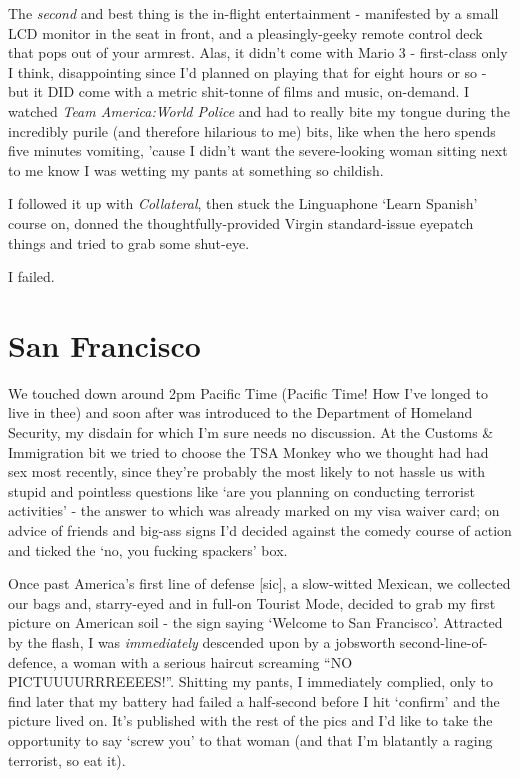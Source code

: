 \documentclass[a5paper,10pt,titlepage,draft]{book}
\begin{document}
The \emph{second} and best thing is the in-flight entertainment - manifested by a small LCD monitor in the seat in front, and a pleasingly-geeky remote control deck that pops out of your armrest.  Alas, it didn't come with Mario 3 - first-class only I think, disappointing since I'd planned on playing that for eight hours or so - but it DID come with a metric shit-tonne of films and music, on-demand.  I watched \emph{Team America:World Police} and had to really bite my tongue during the incredibly purile (and therefore hilarious to me) bits, like when the hero spends five minutes vomiting, 'cause I didn't want the severe-looking woman sitting next to me know I was wetting my pants at something so childish.

I followed it up with \emph{Collateral}, then stuck the Linguaphone `Learn Spanish' course on, donned the thoughtfully-provided Virgin standard-issue eyepatch things and tried to grab some shut-eye.

I failed.

\section*{San Francisco}
We touched down around 2pm Pacific Time (Pacific Time! How I've longed to live in thee) and soon after was introduced to the Department of Homeland Security, my disdain for which I'm sure needs no discussion.  At the Customs \& Immigration bit we tried to choose the TSA Monkey who we thought had had sex most recently, since they're probably the most likely to not hassle us with stupid and pointless questions like `are you planning on conducting terrorist activities' - the answer to which was already marked on my visa waiver card; on advice of friends and big-ass signs I'd decided against the comedy course of action and ticked the `no, you fucking spackers' box.

Once past America's first line of defense [sic], a slow-witted Mexican, we collected our bags and, starry-eyed and in full-on Tourist Mode, decided to grab my first picture on American soil - the sign saying `Welcome to San Francisco'.  Attracted by the flash, I was \emph{immediately} descended upon by a jobsworth second-line-of-defence, a woman with a serious haircut screaming ``NO PICTUUUURRREEEES!''. Shitting my pants, I immediately complied, only to find later that my battery had failed a half-second before I hit `confirm' and the picture lived on.  It's published with the rest of the pics and I'd like to take the opportunity to say `screw you' to that woman (and that I'm blatantly a raging terrorist, so eat it).
\end{document}
